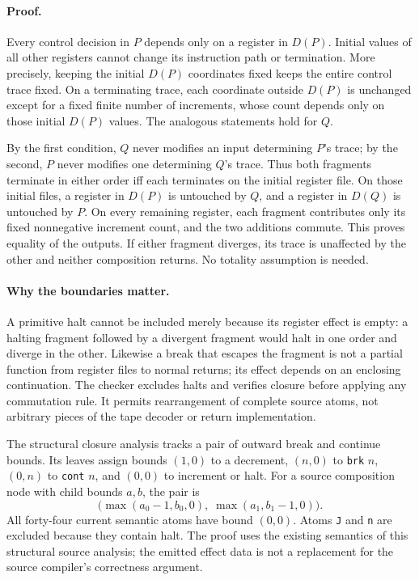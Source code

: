 \paragraph{Proof.}
Every control decision in $P$ depends only on a register in $D(P)$.
Initial values of all other registers cannot change its instruction path
or termination. More precisely, keeping the initial $D(P)$ coordinates
fixed keeps the entire control trace fixed. On a terminating trace, each
coordinate outside $D(P)$ is unchanged except for a fixed finite number
of increments, whose count depends only on those initial $D(P)$ values.
The analogous statements hold for $Q$.

By the first condition, $Q$ never modifies an input determining $P$'s
trace; by the second, $P$ never modifies one determining $Q$'s trace.
Thus both fragments terminate in either order iff each terminates on the
initial register file. On those initial files, a register in $D(P)$ is
untouched by $Q$, and a register in $D(Q)$ is untouched by $P$. On every
remaining register, each fragment contributes only its fixed nonnegative
increment count, and the two additions commute. This proves equality of
the outputs. If either fragment diverges, its trace is unaffected by the
other and neither composition returns. No totality assumption is needed.

\paragraph{Why the boundaries matter.}
A primitive halt cannot be included merely because its register effect
is empty: a halting fragment followed by a divergent fragment would halt
in one order and diverge in the other. Likewise a break that escapes the
fragment is not a partial function from register files to normal returns;
its effect depends on an enclosing continuation. The checker excludes
halts and verifies closure before applying any commutation rule. It
permits rearrangement of complete source atoms, not arbitrary pieces of
the tape decoder or return implementation.

The structural closure analysis tracks a pair of outward break and
continue bounds. Its leaves assign bounds $(1,0)$ to a decrement,
$(n,0)$ to \texttt{brk} $n$, $(0,n)$ to \texttt{cont} $n$, and $(0,0)$
to increment or halt. For a source composition node with child bounds
$a,b$, the pair is
\[
\bigl(\max(a_0-1,b_0,0),\;\max(a_1,b_1-1,0)\bigr).
\]
All forty-four current semantic atoms have bound $(0,0)$. Atoms
\texttt{J} and \texttt{n} are excluded because they contain halt.
The proof uses the existing semantics of this structural source analysis;
the emitted effect data is not a replacement for the source compiler's
correctness argument.

